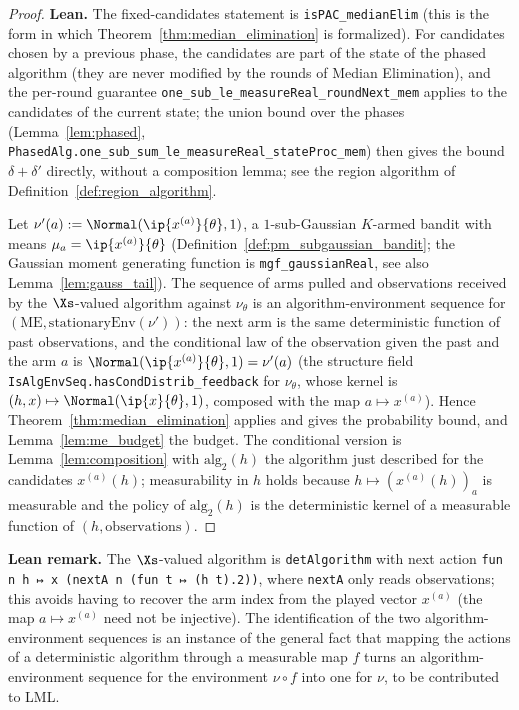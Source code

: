 \begin{proof}
\leanok
{}
\textbf{Lean.} The fixed-candidates statement is \texttt{isPAC\_medianElim} (this is the form in
which Theorem~\ref{thm:median_elimination} is formalized). For candidates chosen by a previous
phase, the candidates are part of the state of the phased algorithm (they are never modified
by the rounds of Median Elimination), and the per-round guarantee
\texttt{one\_sub\_le\_measureReal\_roundNext\_mem} applies to the candidates of the current
state; the union bound over the phases (Lemma~\ref{lem:phased},
\texttt{PhasedAlg.one\_sub\_sum\_le\_measureReal\_stateProc\_mem}) then gives the bound
$\delta + \delta'$ directly, without a composition lemma; see the region algorithm of
Definition~\ref{def:region_algorithm}.

Let $\nu'(a) := \Normal(\ip{x^{(a)}}{\theta},1)$, a $1$-sub-Gaussian $K$-armed bandit with means
$\mu_a = \ip{x^{(a)}}{\theta}$ (Definition~\ref{def:pm_subgaussian_bandit}; the Gaussian moment
generating function is \texttt{mgf\_gaussianReal}, see also Lemma~\ref{lem:gauss_tail}). The
sequence of arms pulled and observations received by the $\Xs$-valued algorithm against
$\nu_\theta$ is an algorithm-environment sequence for $(\mathrm{ME},\mathrm{stationaryEnv}(\nu'))$:
the next arm is the same deterministic function of past observations, and the conditional law
of the observation given the past and the arm $a$ is $\Normal(\ip{x^{(a)}}{\theta},1) = \nu'(a)$
(the structure field \texttt{IsAlgEnvSeq.hasCondDistrib\_feedback} for $\nu_\theta$, whose
kernel is $(h,x)\mapsto\Normal(\ip{x}{\theta},1)$, composed with the map $a\mapsto x^{(a)}$). Hence Theorem~\ref{thm:median_elimination} applies and gives the
probability bound, and Lemma~\ref{lem:me_budget} the budget. The conditional version is
Lemma~\ref{lem:composition} with $\mathrm{alg}_2(h)$ the algorithm just described for the
candidates $x^{(a)}(h)$; measurability in $h$ holds because $h\mapsto(x^{(a)}(h))_a$ is
measurable and the policy of $\mathrm{alg}_2(h)$ is the deterministic kernel of a measurable
function of $(h,\text{observations})$.
\end{proof}

\textbf{Lean remark.} The $\Xs$-valued algorithm is \texttt{detAlgorithm} with next action
\texttt{fun n h ↦ x (nextA n (fun t ↦ (h t).2))}, where \texttt{nextA} only reads observations;
this avoids having to recover the arm index from the played vector $x^{(a)}$ (the map
$a\mapsto x^{(a)}$ need not be injective). The identification of the two
algorithm-environment sequences is an instance of the general fact that mapping the actions of
a deterministic algorithm through a measurable map $f$ turns an algorithm-environment sequence
for the environment $\nu\circ f$ into one for $\nu$, to be contributed to LML.
